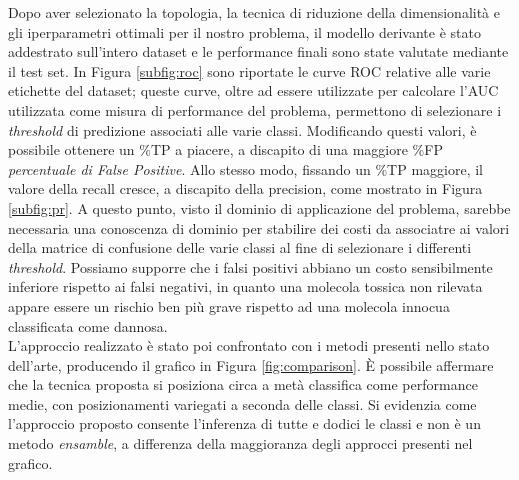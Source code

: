 Dopo aver selezionato la topologia, la tecnica di riduzione della dimensionalità e gli iperparametri ottimali per il nostro problema, il modello derivante è stato addestrato sull'intero dataset e le performance finali sono state valutate mediante il test set.
In Figura \ref{subfig:roc} sono riportate le curve ROC relative alle varie etichette del dataset; queste curve, oltre ad essere utilizzate per calcolare l'AUC utilizzata come misura di performance del problema, permettono di selezionare i \textit{threshold} di predizione associati alle varie classi. 
Modificando questi valori, è possibile ottenere un \%TP a piacere, a discapito di una maggiore \%FP \textit{percentuale di False Positive}. 
Allo stesso modo, fissando un \%TP maggiore, il valore della recall cresce, a discapito della precision, come mostrato in Figura \ref{subfig:pr}. 
A questo punto, visto il dominio di applicazione del problema, sarebbe necessaria una conoscenza di dominio per stabilire dei costi da associatre ai valori della matrice di confusione delle varie classi al fine di selezionare i differenti \textit{threshold}. 
Possiamo supporre che i falsi positivi abbiano un costo sensibilmente inferiore rispetto ai falsi negativi, in quanto una molecola tossica non rilevata appare essere un rischio ben più grave rispetto ad una molecola innocua classificata come dannosa.\\
L'approccio realizzato è stato poi confrontato con i metodi presenti nello stato dell'arte, producendo il grafico in Figura \ref{fig:comparison}. È possibile affermare che la tecnica proposta si posiziona circa a metà classifica come performance medie, con posizionamenti variegati a seconda delle classi. Si evidenzia come l'approccio proposto consente l'inferenza di tutte e dodici le classi e non è un metodo \textit{ensamble}, a differenza della maggioranza degli approcci presenti nel grafico. 

